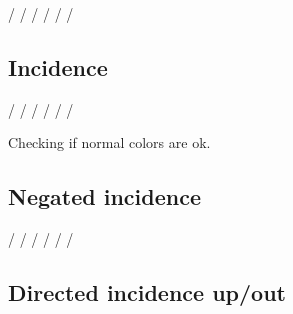 \documentclass{article}
\begin{document}

\GTStestEqualTextsI{\GTSnDADM/}{\GTSnDADMR/}%
{\GTSnegatedDirectedAdjacencyDownMonochrome/}%
{\GTSnegatedDirectedAdjacencyDownMonochromeRelation/}
\GTStestEqualTextsI{\GTSnDADM/}{\GTSnDADMR/}%
{\GTSnegDirAdjDownMono/}%
{\GTSnegDirAdjDownMonoRel/}
\GTStestEqualTextsI{\GTSnDADM/}{\GTSnDADMR/}%
{\GTSnegDirAdjDownMon/}%
{\GTSnegDirAdjDownMonRel/}

\subsection{Incidence}

\GTStestTextII{\GTSiM/}{\GTSiMR/}

\GTStestTextII{\GTSxi[m]}{\GTSxi[m,r]}


\GTStestEqualTextsII{\GTSiM/}{\GTSiMR/}%
{\GTSincidenceMonochrome/}%
{\GTSincidenceMonochromeRelation/}
\GTStestEqualTextsII{\GTSiM/}{\GTSiMR/}%
{\GTSincMono/}%
{\GTSincMonoRel/}
\GTStestEqualTextsII{\GTSiM/}{\GTSiMR/}%
{\GTSincMon/}%
{\GTSincMonRel/}

Checking if normal colors are ok.

\GTStestTextII{\GTSi/}{\GTSiR/}

\subsection{Negated incidence}

\GTStestTextII{\GTSnIM/}{\GTSnIMR/}

\GTStestTextII{\GTSxi[m,n]}{\GTSxi[m,n,r]}


\GTStestEqualTextsII{\GTSnIM/}{\GTSnIMR/}%
{\GTSnegatedIncidenceMonochrome/}%
{\GTSnegatedIncidenceMonochromeRelation/}
\GTStestEqualTextsII{\GTSnIM/}{\GTSnIMR/}%
{\GTSnegIncMono/}%
{\GTSnegIncMonoRel/}
\GTStestEqualTextsII{\GTSnIM/}{\GTSnIMR/}%
{\GTSnegIncMon/}%
{\GTSnegIncMonRel/}

\subsection{Directed incidence up/out}

\GTStestTextII{\GTSoIM/}{\GTSoIMR/}

\GTStestTextII{\GTSxi[m,o]}{\GTSxi[m,o,r]}

\end{document}
